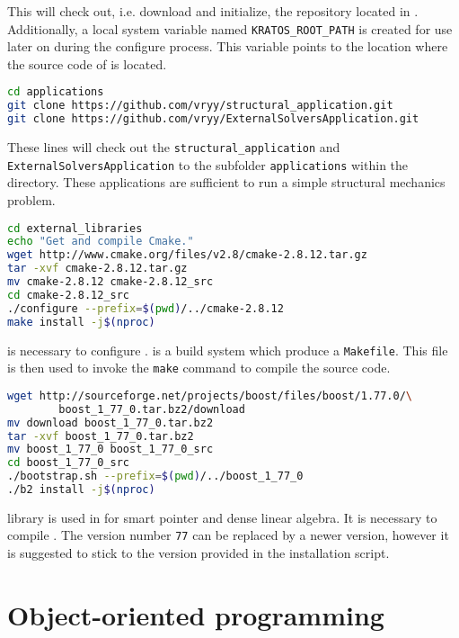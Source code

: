 \documentclass[12pt,a4paper,twoside]{article}
\begin{document}
This will check out, i.e. download and initialize, the \kratos repository located in \github. Additionally, a local system variable named \texttt{KRATOS\_ROOT\_PATH} is created for use later on during the configure process. This variable points to the location where the source code of \kratos is located.

\begin{lstlisting}[language=bash, basicstyle=\footnotesize, frame=single]
cd applications
git clone https://github.com/vryy/structural_application.git
git clone https://github.com/vryy/ExternalSolversApplication.git
\end{lstlisting}

These lines will check out the \texttt{structural\_application} and \texttt{ExternalSolversApplication} to the subfolder \texttt{applications} within the \kratos directory. These applications are sufficient to run a simple structural mechanics problem.

\begin{lstlisting}[language=bash, basicstyle=\footnotesize, frame=single]
cd external_libraries
echo "Get and compile Cmake."
wget http://www.cmake.org/files/v2.8/cmake-2.8.12.tar.gz
tar -xvf cmake-2.8.12.tar.gz
mv cmake-2.8.12 cmake-2.8.12_src
cd cmake-2.8.12_src
./configure --prefix=$(pwd)/../cmake-2.8.12
make install -j$(nproc)
\end{lstlisting}

\cmake is necessary to configure \kratos. \cmake is a build system which produce a \texttt{Makefile}. This file is then used to invoke the \texttt{make} command to compile the source code.

\begin{lstlisting}[language=bash, basicstyle=\footnotesize, frame=single]
wget http://sourceforge.net/projects/boost/files/boost/1.77.0/\
		boost_1_77_0.tar.bz2/download
mv download boost_1_77_0.tar.bz2
tar -xvf boost_1_77_0.tar.bz2
mv boost_1_77_0 boost_1_77_0_src
cd boost_1_77_0_src
./bootstrap.sh --prefix=$(pwd)/../boost_1_77_0
./b2 install -j$(nproc)
\end{lstlisting}

\boost library is used in \kratos for smart pointer and dense linear algebra. It is necessary to compile \boost. The version number \texttt{77} can be replaced by a newer version, however it is suggested to stick to the version provided in the installation script.

\section{Object-oriented programming}
\end{document}
